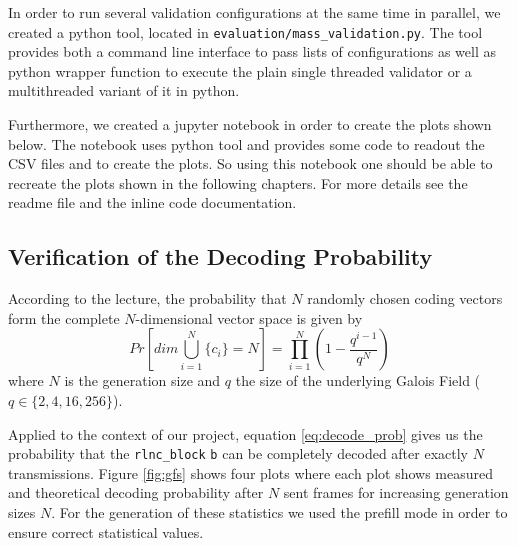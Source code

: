 \documentclass[a4paper,english,10pt]{tumarticle}
\begin{document}
In order to run several validation configurations at the same time in parallel, we created a python tool, located in \texttt{evaluation/mass\_validation.py}.
The tool provides both a command line interface to pass lists of configurations as well as python wrapper function to execute the plain single threaded validator or a multithreaded variant of it in python.

Furthermore, we created a jupyter notebook in order to create the plots shown below. The notebook uses python tool and provides some code to readout the CSV files and to create the plots. So using this notebook one should be able to recreate the plots shown in the following chapters. For more details see the readme file and the inline code documentation.




\subsection{Verification of the Decoding Probability}
According to the lecture, the probability that $N$ randomly chosen coding vectors form
the complete $N$-dimensional vector space is given by %
\begin{equation} 
  Pr[dim\bigcup_{i=1}^{N}\{c_i\} = N] = \prod_{i=1}^{N} (1 - \frac{q^{i - 1}}{q ^ {N}})
  \label{eq:decode_prob}
\end{equation}
where $N$ is the generation size and $q$ the size of the underlying Galois Field ($q \in \{2,4,16,256\}$).

Applied to the context of our project, equation \eqref{eq:decode_prob} gives us
the probability that the \texttt{rlnc\_block} \texttt{b} can be completely
decoded after exactly $N$ transmissions. Figure \ref{fig:gfs} shows four plots
where each plot shows measured and theoretical decoding probability after $N$
sent frames for increasing generation sizes $N$. For the generation of these
statistics we used the prefill mode in order to ensure correct statistical values.
\end{document}
